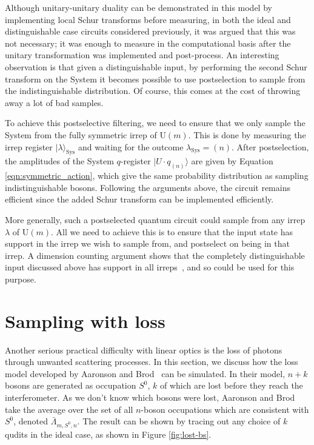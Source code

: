 Although unitary-unitary duality can be demonstrated in this model by implementing local Schur transforms before measuring, in both the ideal and distinguishable case circuits considered previously, it was argued that this was not necessary; it was enough to measure in the computational basis after the unitary transformation was implemented and post-process.
An interesting observation is that given a distinguishable input, by performing the second Schur transform on the System it becomes possible to use postselection to sample from the indistinguishable distribution.
Of course, this comes at the cost of throwing away a lot of bad samples.

To achieve this postselective filtering, we need to ensure that we only sample the System from the fully symmetric irrep of $\textrm{U}(m)$. 
This is done by measuring the irrep register $|\lambda\rangle_{\textrm{Sys}}$ and waiting for the outcome $\lambda_{\textrm{Sys}}=(n)$. 
After postselection, the amplitudes of the System $q$-register $|U\cdot q_{(n)}\rangle$ are given by Equation \ref{eqn:symmetric_action}, which give the same probability distribution as sampling indistinguishable bosons. 
Following the arguments above, the circuit remains efficient since the added Schur transform can be implemented efficiently. 

More generally, such a postselected quantum circuit could sample from any irrep $\lambda$ of $\textrm{U}(m)$. 
All we need to achieve this is to ensure that the input state has support in the irrep we wish to sample from, and postselect on being in that irrep.
A dimension counting argument shows that the completely distinguishable input discussed above has support in all irreps~\cite{stanisic2018}, and so could be used for this purpose.



\section{Sampling with loss}
\label{sec:nc-loss}

Another serious practical difficulty with linear optics is the loss of photons through unwanted scattering processes. 
In this section, we discuss how the loss model developed by Aaronson and Brod~\cite{aaronson2015} can be simulated. 
In their model, $n+k$ bosons are generated as occupation $S^0$, $k$ of which are lost before they reach the interferometer. 
As we don't know which bosons were lost, Aaronson and Brod take the average over the set of all $n$-boson occupations which are consistent with $S^0$, denoted $\bar{\Lambda}_{m,S^0,n}$.
The result can be shown by tracing out any choice of $k$ qudits in the ideal case, as shown in Figure \ref{fig:lost-bs}. 

